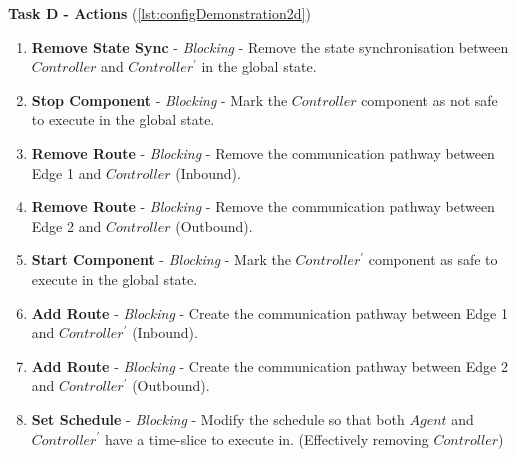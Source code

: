 \textbf{Task D - Actions} (\autoref{lst:configDemonstration2d})
 \begin{enumerate}
    \item \textbf{Remove State Sync} - \textit{Blocking} - Remove the state synchronisation between $Controller$ and $Controller^{\prime}$ in the global state.
    \item \textbf{Stop Component} - \textit{Blocking} - Mark the $Controller$ component as not safe to execute in the global state.
    \item \textbf{Remove Route} - \textit{Blocking} - Remove the communication pathway between Edge 1 and $Controller$ (Inbound).
    \item \textbf{Remove Route} - \textit{Blocking} - Remove the communication pathway between Edge 2 and $Controller$ (Outbound).
    \item \textbf{Start Component} - \textit{Blocking} - Mark the $Controller^{\prime}$ component as safe to execute in the global state.
    \item \textbf{Add Route} - \textit{Blocking} - Create the communication pathway between Edge 1 and $Controller^{\prime}$ (Inbound).
    \item \textbf{Add Route} - \textit{Blocking} - Create the communication pathway between Edge 2 and $Controller^{\prime}$ (Outbound).
    \item \textbf{Set Schedule} - \textit{Blocking} - Modify the schedule so that both $Agent$ and $Controller^{\prime}$ have a time-slice to execute in. (Effectively removing $Controller$)
\end{enumerate}

\clearpage

